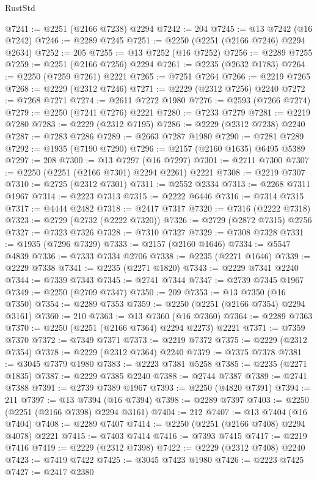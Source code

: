 \begin{lexlean}{RustStd}
\begin{coremodule}
{\begin{coremodule}
{{{{{{{{{{{{{{{{{{{{{{{{{{{{{{{{{{{{{{{{{{{{{{{{{{{{{@7241 := @2251 (@2166 @7238) @2294
@7242 := 204
@7245 := @13 @7242 (@16 @7242)
@7246 := @2289 @7245
@7251 := @2250 (@2251 (@2166 @7246) @2294 @2634)
@7252 := 205
@7255 := @13 @7252 (@16 @7252)
@7256 := @2289 @7255
@7259 := @2251 (@2166 @7256) @2294
@7261 := @2235 (@2632 @1783)
@7264 := @2250 (@7259 @7261) @2221
@7265 := @7251 @7264
@7266 := @2219 @7265
@7268 := @2229 (@2312 @7246)
@7271 := @2229 (@2312 @7256) @2240
@7272 := @7268 @7271
@7274 := @2611 @7272 @1980
@7276 := @2593 (@7266 @7274)
@7279 := @2250 (@7241 @7276) @2221
@7280 := @7233 @7279
@7281 := @2219 @7280
@7283 := @2229 (@2312 @7195)
@7286 := @2229 (@2312 @7238) @2240
@7287 := @7283 @7286
@7289 := @2663 @7287 @1980
@7290 := @7281 @7289
@7292 := @1935 (@7190 @7290)
@7296 := @2157 (@2160 @1635) @6495 @5389
@7297 := 208
@7300 := @13 @7297 (@16 @7297)
@7301 := @2711 @7300
@7307 := @2250 (@2251 (@2166 @7301) @2294 @2261) @2221
@7308 := @2219 @7307
@7310 := @2725 (@2312 @7301)
@7311 := @2552 @2334
@7313 := @2268 @7311 @1967
@7314 := @2223 @7313
@7315 := @2222 @6446
@7316 := @7314 @7315
@7317 := @4444 @2482
@7318 := @2417 @7317
@7320 := @7316 (@2222 @7318)
@7323 := @2729 (@2732 (@2222 @7320))
@7326 := @2729 (@2872 @7315) @2756
@7327 := @7323 @7326
@7328 := @7310 @7327
@7329 := @7308 @7328
@7331 := @1935 (@7296 @7329)
@7333 := @2157 (@2160 @1646)
@7334 := @5547 @4839
@7336 := @7333 @7334 @2706
@7338 := @2235 (@2271 @1646)
@7339 := @2229 @7338
@7341 := @2235 (@2271 @1820)
@7343 := @2229 @7341 @2240
@7344 := @7339 @7343
@7345 := @2741 @7344
@7347 := @2739 @7345 @1967
@7349 := @2250 (@2709 @7347)
@7350 := 209
@7353 := @13 @7350 (@16 @7350)
@7354 := @2289 @7353
@7359 := @2250 (@2251 (@2166 @7354) @2294 @3161)
@7360 := 210
@7363 := @13 @7360 (@16 @7360)
@7364 := @2289 @7363
@7370 := @2250 (@2251 (@2166 @7364) @2294 @2273) @2221
@7371 := @7359 @7370
@7372 := @7349 @7371
@7373 := @2219 @7372
@7375 := @2229 (@2312 @7354)
@7378 := @2229 (@2312 @7364) @2240
@7379 := @7375 @7378
@7381 := @3045 @7379 @1980
@7383 := @2223 @7381 @5258
@7385 := @2235 (@2271 @1835)
@7387 := @2229 @7385 @2240
@7388 := @2744 @7387
@7389 := @2741 @7388
@7391 := @2739 @7389 @1967
@7393 := @2250 (@4820 @7391)
@7394 := 211
@7397 := @13 @7394 (@16 @7394)
@7398 := @2289 @7397
@7403 := @2250 (@2251 (@2166 @7398) @2294 @3161)
@7404 := 212
@7407 := @13 @7404 (@16 @7404)
@7408 := @2289 @7407
@7414 := @2250 (@2251 (@2166 @7408) @2294 @4078) @2221
@7415 := @7403 @7414
@7416 := @7393 @7415
@7417 := @2219 @7416
@7419 := @2229 (@2312 @7398)
@7422 := @2229 (@2312 @7408) @2240
@7423 := @7419 @7422
@7425 := @3045 @7423 @1980
@7426 := @2223 @7425
@7427 := @2417 @2380
}}}}}}}}}}}}}}}}}}}}}}}}}}}}}}}}}}}}}}}}}}}}}}}}}}}}}
\end{coremodule}}
\end{coremodule}
\end{lexlean}
